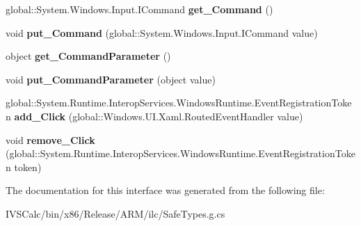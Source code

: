 \begin{DoxyCompactItemize}
\item 
\mbox{\label{interface_windows_1_1_u_i_1_1_xaml_1_1_controls_1_1_primitives_1_1_i_button_base_a32d7306ce7ae819ba8afcf8654502772}} 
global\+::\+System.\+Windows.\+Input.\+I\+Command {\bfseries get\+\_\+\+Command} ()
\item 
\mbox{\label{interface_windows_1_1_u_i_1_1_xaml_1_1_controls_1_1_primitives_1_1_i_button_base_a9a50f3b26afbef855e934ed8c1aa1c7a}} 
void {\bfseries put\+\_\+\+Command} (global\+::\+System.\+Windows.\+Input.\+I\+Command value)
\item 
\mbox{\label{interface_windows_1_1_u_i_1_1_xaml_1_1_controls_1_1_primitives_1_1_i_button_base_a844671cebaf433eca7be5733492d0c32}} 
object {\bfseries get\+\_\+\+Command\+Parameter} ()
\item 
\mbox{\label{interface_windows_1_1_u_i_1_1_xaml_1_1_controls_1_1_primitives_1_1_i_button_base_ae70dfa727c7375ca02faf4ed550e7941}} 
void {\bfseries put\+\_\+\+Command\+Parameter} (object value)
\item 
\mbox{\label{interface_windows_1_1_u_i_1_1_xaml_1_1_controls_1_1_primitives_1_1_i_button_base_a810a2e8203417bd2fe1eb15adc0d85b5}} 
global\+::\+System.\+Runtime.\+Interop\+Services.\+Windows\+Runtime.\+Event\+Registration\+Token {\bfseries add\+\_\+\+Click} (global\+::\+Windows.\+U\+I.\+Xaml.\+Routed\+Event\+Handler value)
\item 
\mbox{\label{interface_windows_1_1_u_i_1_1_xaml_1_1_controls_1_1_primitives_1_1_i_button_base_a96ebd008b8c4baa9c89c7671ec31b0a3}} 
void {\bfseries remove\+\_\+\+Click} (global\+::\+System.\+Runtime.\+Interop\+Services.\+Windows\+Runtime.\+Event\+Registration\+Token token)
\end{DoxyCompactItemize}


The documentation for this interface was generated from the following file\+:\begin{DoxyCompactItemize}
\item 
I\+V\+S\+Calc/bin/x86/\+Release/\+A\+R\+M/ilc/Safe\+Types.\+g.\+cs\end{DoxyCompactItemize}
